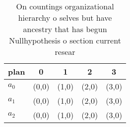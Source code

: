 \documentclass[a4paper]{article}
\begin{document}
\begin{table}
\begin{adjustbox}{width=0.7\columnwidth}
\begin{tabular}{|l|l|l|l|l|}
\hline
\textbf{plan} & \multicolumn{1}{c|}{\textbf{0}} & \multicolumn{1}{c|}{\textbf{1}} & \multicolumn{1}{c|}{\textbf{2}} & \multicolumn{1}{c|}{\textbf{3}} \\ \hline
\textbf{$a_0$}  & (0,0) & (1,0) & (2,0) & (3,0) \\ \hline
\textbf{$a_1$}  & (0,0) & (1,0) & (2,0) & (3,0) \\ \hline
\textbf{$a_2$}  & (0,0) & (1,0) & (2,0) & (3,0) \\ \hline
\end{tabular}
\end{adjustbox}
\caption{On countings organizational hierarchy o selves but have ancestry that has begun Nullhypothesis o section current resear
}
\end{table}
\end{document}

